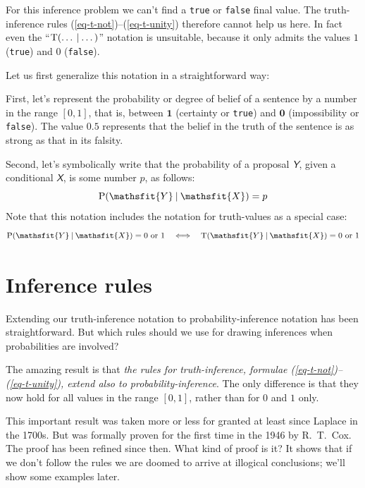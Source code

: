 \documentclass[
  a4paper,
  DIV=11,
  numbers=noendperiod,
  oneside]{scrreprt}
\begin{document}
For this inference problem we can't find a \texttt{true} or
\texttt{false} final value. The truth-inference rules
(\ref{eq-t-not})--(\ref{eq-t-unity}) therefore cannot help us here. In
fact even the
{``\(\mathrm{T}(\dotso \nonscript\:\vert\nonscript\:\mathopen{} \dotso)\)''}
notation is unsuitable, because it only admits the values \(1\)
(\texttt{true}) and \(0\) (\texttt{false}).

Let us first generalize this notation in a straightforward way:

First, let's represent the probability or degree of belief of a sentence
by a number in the range {\([0,1]\),} that is, between \(\mathbf{1}\)
(certainty or \texttt{true}) and \(\mathbf{0}\) (impossibility or
\texttt{false}). The value \(0.5\) represents that the belief in the
truth of the sentence is as strong as that in its falsity.

Second, let's symbolically write that the probability of a proposal
\(\mathsfit{Y}\), given a conditional \(\mathsfit{X}\), is some number
\(p\), as follows: \[
\mathrm{P}(\mathsfit{Y}\nonscript\:\vert\nonscript\:\mathopen{} \mathsfit{X}) = p
\] Note that this notation includes the notation for truth-values as a
special case: \[
\mathrm{P}(\mathsfit{Y}\nonscript\:\vert\nonscript\:\mathopen{} \mathsfit{X}) = 0\text{ or }1
\quad\Longleftrightarrow\quad
\mathrm{T}(\mathsfit{Y}\nonscript\:\vert\nonscript\:\mathopen{} \mathsfit{X}) = 0\text{ or }1
\]

\hypertarget{inference-rules}{%
\section{Inference rules}\label{inference-rules}}

Extending our truth-inference notation to probability-inference notation
has been straightforward. But which rules should we use for drawing
inferences when probabilities are involved?

The amazing result is that \emph{the rules for truth-inference, formulae
(\ref{eq-t-not})--(\ref{eq-t-unity}), extend also to
probability-inference}. The only difference is that they now hold for
all values in the range \([0,1]\), rather than for \(0\) and \(1\) only.

This important result was taken more or less for granted at least since
Laplace in the 1700s. But was formally proven for the first time in the
1946 by R.~T.~Cox. The proof has been refined since then. What kind of
proof is it? It shows that if we don't follow the rules we are doomed to
arrive at illogical conclusions; we'll show some examples later.
\end{document}
